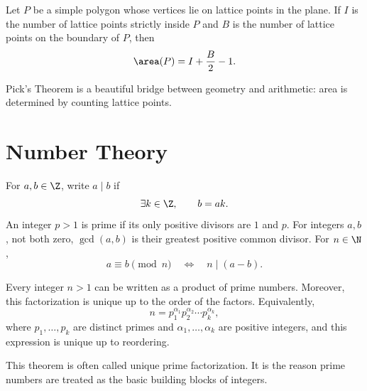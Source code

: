     \begin{theorem}
        Let $P$ be a simple polygon whose vertices lie on lattice points in the
        plane. If $I$ is the number of lattice points strictly inside $P$ and
        $B$ is the number of lattice points on the boundary of $P$, then
        \[
            \area(P)
            =
            I+\frac{B}{2}-1.
        \]
    \end{theorem}

    \begin{remark}
        Pick's Theorem is a beautiful bridge between geometry and arithmetic:
        area is determined by counting lattice points.
    \end{remark}

    \chapter{Number Theory}



    \begin{definition}
        For $a,b\in\Z$, write $a\mid b$ if
        \[
            \exists k\in\Z,
            \qquad
            b=ak.
        \]
        An integer $p>1$ is prime if its only positive divisors are $1$ and
        $p$. For integers $a,b$, not both zero, $\gcd(a,b)$ is their greatest
        positive common divisor. For $n\in\N$,
        \[
            a\equiv b\pmod n
            \quad\Longleftrightarrow\quad
            n\mid(a-b).
        \]
    \end{definition}

    \begin{theorem}
        Every integer $n>1$ can be written as a product of prime numbers.
        Moreover, this factorization is unique up to the order of the factors.
        Equivalently,
        \[
            n=p_1^{\alpha_1}p_2^{\alpha_2}\cdots p_k^{\alpha_k},
        \]
        where $p_1,\dots,p_k$ are distinct primes and
        $\alpha_1,\dots,\alpha_k$ are positive integers, and this expression is
        unique up to reordering.
    \end{theorem}

    \begin{remark}
        This theorem is often called unique prime factorization. It is the
        reason prime numbers are treated as the basic building blocks of
        integers.
    \end{remark}

